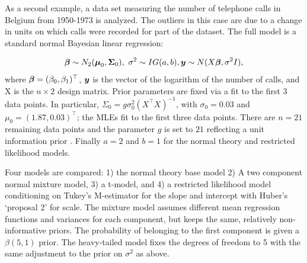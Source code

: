 \documentclass[ba]{imsart}
\def\bbeta{\mbox{\boldmath $\beta$}}
\newcommand{\by}{\mbox{\boldmath $y$}}
\begin{document}
As a second example, a data set measuring the number of telephone calls in Belgium from 1950-1973 is analyzed. The outliers in this case are due to a change in units on which calls were recorded for part of the dataset. The full model is a standard normal Bayesian linear regression:

\begin{equation}
{\boldsymbol{\beta}}\sim N_{2}(\boldsymbol{\mu}_{0}, \boldsymbol{\Sigma}_{0}),\  \sigma^{2} \sim IG(a, b), \by \sim N(X\boldsymbol{\beta}, \sigma^{2} I),
\end{equation}
where $\bbeta = (\beta_{0}, \beta_{1})^{\top}$, $\by$ is the vector of the logarithm of the number of calls, and X is the $n\times 2$ design matrix.  Prior parameters are fixed via a fit to the first 3 data points. In particular, $\Sigma_{0} = g\sigma_{0}^2 (X^{\top}X)^{-1}$, with $\sigma_{0} = 0.03$ and $\mu_{0} = (1.87,  0.03)^{\top}$; the MLEs fit to the first three data points. There are $n=21$ remaining data points and the parameter $g$ is set to $21$ reflecting a unit information prior \citep{kass1995reference}. Finally $a = 2$ and $b =1$ for the normal theory and restricted likelihood models. 

Four models are compared: 1) the normal theory base model 2) A two component normal mixture model, 3) a t-model, and 4) a restricted likelihood model conditioning on Tukey's M-estimator for the slope and intercept with Huber's `proposal 2'  for scale. The mixture model assumes different mean regression functions and variances for each component, but keeps the same, relatively non-informative priors. The probability of belonging to the first component is given a $\beta(5,1)$ prior. The heavy-tailed model fixes the degrees of freedom to 5 with the same adjustment to the prior on $\sigma^{2}$ as above. 
\end{document}
